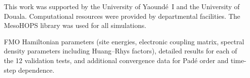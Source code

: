 \documentclass[journal=jctc,manuscript=article]{achemso}
\begin{document}
\begin{acknowledgement}
This work was supported by the University of Yaoundé~I and the University of Douala. Computational resources were provided by departmental facilities. The MesoHOPS library was used for all simulations.
\end{acknowledgement}

\begin{suppinfo}
FMO Hamiltonian parameters (site energies, electronic coupling matrix, spectral density parameters including Huang--Rhys factors), detailed results for each of the 12 validation tests, and additional convergence data for Padé order and time-step dependence.
\end{suppinfo}


\end{document}
